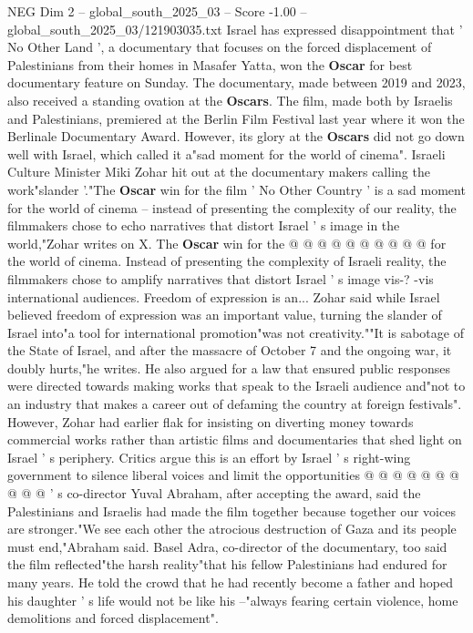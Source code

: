 \begin{textsample}{NEG Dim 2 – global\_south\_2025\_03 – Score -1.00 – global\_south\_2025\_03/121903035.txt}  \label{ex:f2_neg_154}
Israel has expressed disappointment that ' No Other Land ', a documentary that focuses on the forced displacement of Palestinians from their homes in Masafer Yatta, won the \textbf{Oscar} for best documentary feature on Sunday.
The documentary, made between 2019 and 2023, also received a standing ovation at the \textbf{Oscars}.
The film, made both by Israelis and Palestinians, premiered at the Berlin Film Festival last year where it won the Berlinale Documentary Award.
However, its glory at the \textbf{Oscars} did not go down well with Israel, which called it a"sad moment for the world of cinema".
Israeli Culture Minister Miki Zohar hit out at the documentary makers calling the work"slander '."The \textbf{Oscar} win for the film ' No Other Country ' is a sad moment for the world of cinema -- instead of presenting the complexity of our reality, the filmmakers chose to echo narratives that distort Israel ' s image in the world,"Zohar writes on X.
The \textbf{Oscar} win for the @ @ @ @ @ @ @ @ @ @ for the world of cinema.
Instead of presenting the complexity of Israeli reality, the filmmakers chose to amplify narratives that distort Israel ' s image vis-? -vis international audiences.
Freedom of expression is an...
Zohar said while Israel believed freedom of expression was an important value, turning the slander of Israel into"a tool for international promotion"was not creativity.""It is sabotage of the State of Israel, and after the massacre of October 7 and the ongoing war, it doubly hurts,"he writes.
He also argued for a law that ensured public responses were directed towards making works that speak to the Israeli audience and"not to an industry that makes a career out of defaming the country at foreign festivals".
However, Zohar had earlier flak for insisting on diverting money towards commercial works rather than artistic films and documentaries that shed light on Israel ' s periphery.
Critics argue this is an effort by Israel ' s right-wing government to silence liberal voices and limit the opportunities @ @ @ @ @ @ @ @ @ @ ' s co-director Yuval Abraham, after accepting the award, said the Palestinians and Israelis had made the film together because together our voices are stronger."We see each other the atrocious destruction of Gaza and its people must end,"Abraham said.
Basel Adra, co-director of the documentary, too said the film reflected"the harsh reality"that his fellow Palestinians had endured for many years.
He told the crowd that he had recently become a father and hoped his daughter ' s life would not be like his --"always fearing certain violence, home demolitions and forced displacement".

\end{textsample}
